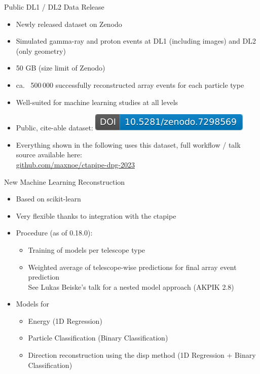 \documentclass[aspectratio=1610, 9pt]{beamer}
\begin{document}
\begin{frame}{Public DL1 / DL2 Data Release}
  \begin{itemize}
    \item Newly released dataset on Zenodo
    \item Simulated gamma-ray and proton events at DL1 (including images) and DL2 (only geometry) 
    \item 50 GB (size limit of Zenodo)
    \item ca.~ 500\,000 successfully reconstructed array events for each particle type
    \item Well-suited for machine learning studies at all levels
    \item Public, cite-able dataset: \href{https://doi.org/10.5281/zenodo.7298568}{\includegraphics[height=2ex]{./images/public_data_zenodo.pdf}}

    \item Everything shown in the following uses this dataset, full workflow / talk source available here: \\
      \href{https://github.com/maxnoe/ctapipe-dpg-2023}{github.com/maxnoe/ctapipe-dpg-2023}
  \end{itemize}
\end{frame}

\begin{frame}{New Machine Learning Reconstruction}
  \begin{itemize}
    \item Based on scikit-learn
    \item Very flexible thanks to integration with the ctapipe
    \item Procedure (as of 0.18.0):
      \begin{itemize}
        \item Training of models per telescope type
        \item Weighted average of telescope-wise predictions for final array event prediction\\
          See Lukas Beiske's talk for a nested model approach (AKPIK 2.8) 
      \end{itemize}
    \item Models for
      \begin{itemize}
        \item Energy (1D Regression)
        \item Particle Classification (Binary Classification)
        \item Direction reconstruction using the disp method (1D Regression + Binary Classification)
      \end{itemize}
  \end{itemize}
\end{frame}
\end{document}
